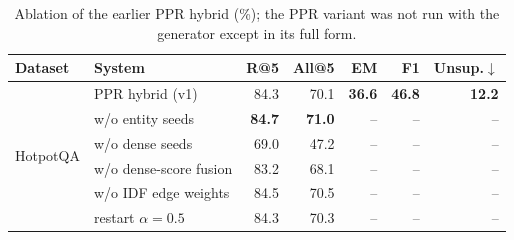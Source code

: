 \begin{table}[t]
\centering
\small
\caption{Ablation of the earlier PPR hybrid (\%); the PPR variant was not run with the generator except in its full form.}
\label{tab:ablation}
\begin{tabular}{llrrrrr}
\toprule
Dataset & System & R@5 & All@5 & EM & F1 & Unsup.$\downarrow$ \\
\midrule
\multirow{6}{*}{HotpotQA} & PPR hybrid (v1) & 84.3 & 70.1 & \textbf{36.6} & \textbf{46.8} & \textbf{12.2} \\
 & w/o entity seeds & \textbf{84.7} & \textbf{71.0} & -- & -- & -- \\
 & w/o dense seeds & 69.0 & 47.2 & -- & -- & -- \\
 & w/o dense-score fusion & 83.2 & 68.1 & -- & -- & -- \\
 & w/o IDF edge weights & 84.5 & 70.5 & -- & -- & -- \\
 & restart $\alpha=0.5$ & 84.3 & 70.3 & -- & -- & -- \\
\bottomrule
\end{tabular}
\end{table}